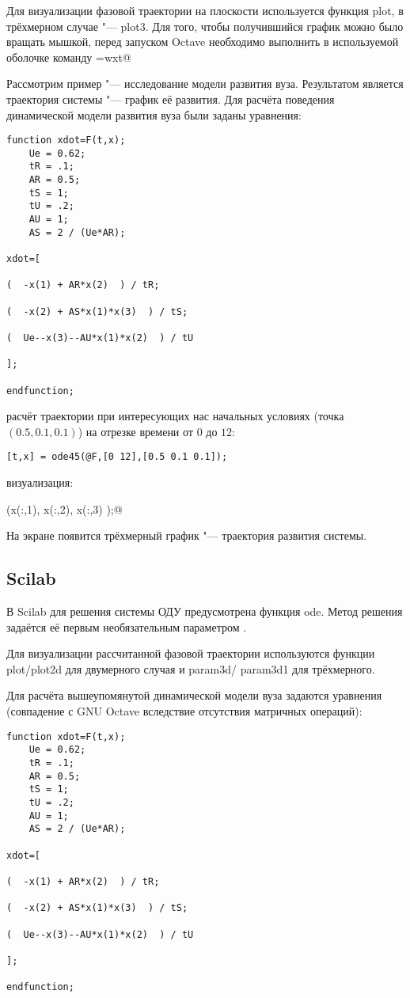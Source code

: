 \documentclass[10pt, a5paper]{article}
\begin{document}
Для визуализации фазовой траектории на плоскости используется функция plot, в трёхмерном случае "--- plot3. Для того, чтобы получившийся график можно было вращать мышкой, перед запуском Octave необходимо выполнить в используемой оболочке команду \verb@GNUTERM=wxt@

Рассмотрим пример "--- исследование модели развития вуза. Результатом является траектория системы "--- график её развития.
Для расчёта поведения динамической модели развития вуза \cite{Kon2} были заданы уравнения:
\begin{verbatim}
function xdot=F(t,x);
    Ue = 0.62;
    tR = .1;
    AR = 0.5;
    tS = 1;
    tU = .2;
    AU = 1;
    AS = 2 / (Ue*AR);

xdot=[

(  -x(1) + AR*x(2)  ) / tR;

(  -x(2) + AS*x(1)*x(3)  ) / tS;

(  Ue--x(3)--AU*x(1)*x(2)  ) / tU

];

endfunction;
\end{verbatim}
расчёт траектории при интересующих нас начальных условиях (точка $(0.5, 0.1, 0.1)$) на отрезке времени от $0$ до $12$:

\verb![t,x] = ode45(@F,[0 12],[0.5 0.1 0.1]);!

визуализация:

(x(:,1), x(:,2), x(:,3) );@

На экране появится трёхмерный график "--- траектория развития системы.

\subsection*{Scilab}

В Scilab для решения системы ОДУ предусмотрена функция ode. Метод решения задаётся её первым необязательным параметром \cite{Kon3}.

Для визуализации рассчитанной фазовой траектории используются функции plot/plot2d для двумерного случая и param3d/ param3d1 для трёхмерного.

Для расчёта вышеупомянутой динамической модели вуза задаются уравнения (совпадение с GNU Octave вследствие отсутствия матричных операций):
\begin{verbatim}
function xdot=F(t,x);
    Ue = 0.62;
    tR = .1;
    AR = 0.5;
    tS = 1;
    tU = .2;
    AU = 1;
    AS = 2 / (Ue*AR);

xdot=[

(  -x(1) + AR*x(2)  ) / tR;

(  -x(2) + AS*x(1)*x(3)  ) / tS;

(  Ue--x(3)--AU*x(1)*x(2)  ) / tU

];

endfunction;
\end{verbatim}
\end{document}
